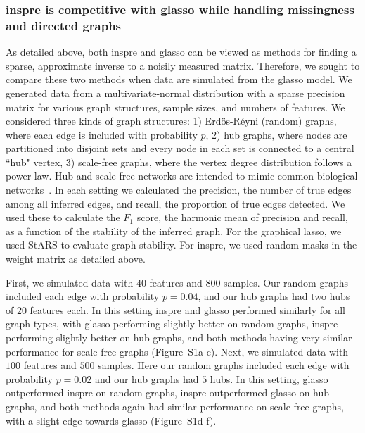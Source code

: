 \documentclass{article}
\begin{document}
\subsubsection*{inspre is competitive with glasso while handling missingness and directed graphs}
As detailed above, both inspre and glasso can be viewed as methods
for finding a sparse, approximate inverse to a noisily measured matrix.
Therefore, we sought to compare these two methods when data are simulated
from the glasso model. We generated data
from a multivariate-normal distribution with a sparse precision matrix
for various graph structures, sample sizes, and numbers of features.
We considered three kinds of graph structures: 1) Erd\"os-R\'eyni (random) graphs,
where each edge is included with probability $p$, 2) hub graphs, where nodes
are partitioned into
disjoint sets and every node in each set is connected to a central ``hub" vertex,
3) scale-free graphs, where the vertex degree distribution
follows a power law. Hub and scale-free networks are intended to mimic common
biological networks~\cite{Barabasi1999}. In each setting we calculated the precision,
the number of true edges among all inferred edges, and recall, the proportion
of true edges detected. We used these to calculate the $F_1$ score, the
harmonic mean of precision and recall, as a function of the
stability of the inferred graph. For the graphical lasso, we used StARS to
evaluate graph stability. For inspre, we used random masks in the weight matrix
as detailed above.

First, we simulated data with $40$ features and $800$ samples. Our random
graphs included each edge with probability $p=0.04$, and our hub graphs had
two hubs of $20$ features each. In this setting inspre and glasso performed
similarly for all graph types, with glasso performing slightly better on
random graphs, inspre performing slightly better on hub graphs, and 
both methods having very similar performance for scale-free graphs
(Figure~S1a-c). Next, we simulated  data with $100$
features and $500$ samples. Here our random graphs included each edge with
probability $p=0.02$ and our hub graphs had $5$ hubs. In this setting, glasso outperformed inspre on
random graphs, inspre outperformed glasso on hub graphs, and both methods again
had similar performance on scale-free graphs, with a slight edge towards
glasso (Figure~S1d-f).
\end{document}
